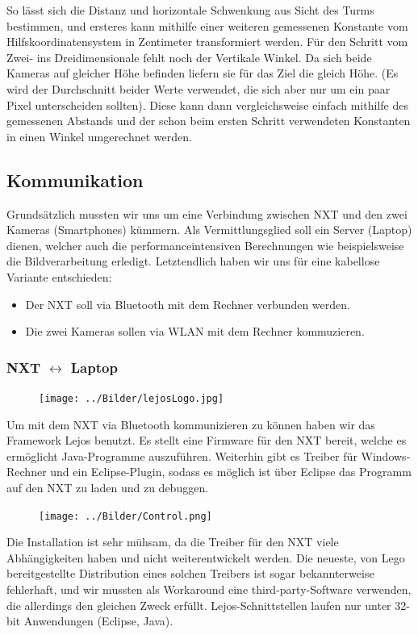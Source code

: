 \documentclass[12pt,a4paper]{article}
\begin{document}
So lässt sich die Distanz und horizontale Schwenkung aus Sicht des Turms bestimmen, und ersteres kann mithilfe einer weiteren gemessenen Konstante vom Hilfskoordinatensystem in Zentimeter transformiert werden.
Für den Schritt vom Zwei- ins Dreidimensionale fehlt noch der Vertikale Winkel. Da sich beide Kameras auf gleicher Höhe befinden liefern sie für das Ziel die gleich Höhe. (Es wird der Durchschnitt beider Werte verwendet, die sich aber nur um ein paar Pixel unterscheiden sollten). Diese kann dann vergleichsweise einfach mithilfe des gemessenen Abstands und der schon beim ersten Schritt verwendeten Konstanten in einen Winkel umgerechnet werden.

\subsection{Kommunikation}
Grundsätzlich mussten wir uns um eine Verbindung zwischen NXT und den zwei Kameras (Smartphones) kümmern. Als Vermittlungsglied soll ein Server (Laptop) dienen, welcher auch die performanceintensiven Berechnungen wie beispielsweise die Bildverarbeitung erledigt. Letztendlich haben wir uns für eine kabellose Variante entschieden:
\begin{itemize}
\item
Der NXT soll via Bluetooth mit dem Rechner verbunden werden.
\item
Die zwei Kameras sollen via WLAN mit dem Rechner kommuzieren.
\end{itemize}

\subsubsection*{NXT $\leftrightarrow$ Laptop}
\begin{figure}
  \vspace{-40pt}
  \begin{center}
    \texttt{[image: ../Bilder/lejosLogo.jpg]}
  \end{center}
  \vspace{-15pt}
\end{figure}
Um mit dem NXT via Bluetooth kommunizieren zu können haben wir das Framework Lejos benutzt.
Es stellt eine Firmware für den NXT bereit, welche es ermöglicht Java-Programme auszuführen.
Weiterhin gibt es Treiber für Windows-Rechner und ein Eclipse-Plugin, sodass es möglich ist über Eclipse das Programm auf den NXT zu laden und zu debuggen.
\begin{figure}
  \vspace{-30pt}
  \begin{center}
    \texttt{[image: ../Bilder/Control.png]}
  \end{center}
  \vspace{-15pt}
\end{figure}
Die Installation ist sehr mühsam, da die Treiber für den NXT viele Abhängigkeiten haben und nicht weiterentwickelt werden. Die neueste, von Lego bereitgestellte Distribution eines solchen Treibers ist sogar bekannterweise fehlerhaft, und wir mussten als Workaround eine third-party-Software verwenden, die allerdings den gleichen Zweck erfüllt.
Lejos-Schnittstellen laufen nur unter 32-bit Anwendungen (Eclipse, Java).
\end{document}
